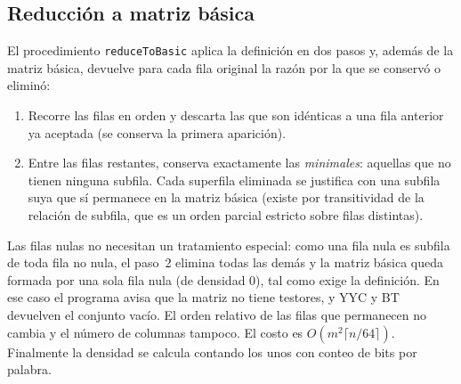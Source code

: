 \documentclass[11pt, a4paper]{article}
\theoremstyle{definition}
\theoremstyle{plain}
\begin{document}
\subsection{Reducción a matriz básica}
El procedimiento \texttt{reduceToBasic} aplica la definición en dos pasos y,
además de la matriz básica, devuelve para cada fila original la razón por la
que se conservó o eliminó:
\begin{enumerate}[nosep]
\item Recorre las filas en orden y descarta las que son idénticas a una fila
  anterior ya aceptada (se conserva la primera aparición).
\item Entre las filas restantes, conserva exactamente las \emph{minimales}:
  aquellas que no tienen ninguna subfila. Cada superfila eliminada se justifica
  con una subfila suya que sí permanece en la matriz básica (existe por
  transitividad de la relación de subfila, que es un orden parcial estricto
  sobre filas distintas).
\end{enumerate}
Las filas nulas no necesitan un tratamiento especial: como una fila nula es
subfila de toda fila no nula, el paso~2 elimina todas las demás y la matriz
básica queda formada por una sola fila nula (de densidad $0$), tal como exige la
definición. En ese caso el programa avisa que la matriz no tiene testores, y
YYC y BT devuelven el conjunto vacío.
El orden relativo de las filas que permanecen no cambia y el número de
columnas tampoco. El costo es $O(m^2\lceil n/64\rceil)$. Finalmente la densidad
se calcula contando los unos con conteo de bits por palabra.
\end{document}
